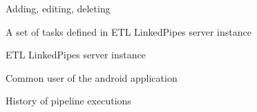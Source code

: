 \item[Managing] Adding, editing, deleting
\item[Pipeline] A set of tasks defined in ETL LinkedPipes server instance
\item[Server instance] ETL LinkedPipes server instance
\item[User] Common user of the android application
\item[History] History of pipeline executions